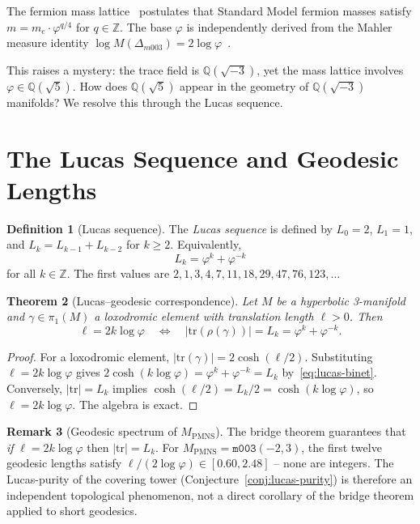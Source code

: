 \documentclass[12pt]{article}
\newtheorem{theorem}{Theorem}
\theoremstyle{definition}
\newtheorem{definition}[theorem]{Definition}
\newtheorem{remark}[theorem]{Remark}
\newcommand{\Z}{\mathbb{Z}}
\newcommand{\Q}{\mathbb{Q}}
\newcommand{\ph}{\varphi}
\newcommand{\logph}{\log\ph}
\begin{document}
The fermion mass lattice~\cite{gentry-core} postulates that Standard
Model fermion masses satisfy $m = m_e \cdot \ph^{q/4}$ for $q \in \Z$.
The base $\ph$ is independently derived from the Mahler measure identity
$\log M(\Delta_{m003}) = 2\logph$~\cite{gentry-jktr}.

This raises a mystery: the trace field is $\Q(\sqrt{-3})$, yet the
mass lattice involves $\ph \in \Q(\sqrt{5})$. How does $\Q(\sqrt{5})$
appear in the geometry of $\Q(\sqrt{-3})$ manifolds?
We resolve this through the Lucas sequence.

\section{The Lucas Sequence and Geodesic Lengths}

\begin{definition}[Lucas sequence]
The \emph{Lucas sequence} is defined by $L_0 = 2$, $L_1 = 1$, and
$L_k = L_{k-1} + L_{k-2}$ for $k \geq 2$. Equivalently,
\begin{equation}
  L_k = \ph^k + \ph^{-k}
  \label{eq:lucas-binet}
\end{equation}
for all $k \in \Z$. The first values are
$2, 1, 3, 4, 7, 11, 18, 29, 47, 76, 123, \ldots$
\end{definition}

\begin{theorem}[Lucas--geodesic correspondence]
\label{thm:lucas-geodesic}
Let $M$ be a hyperbolic 3-manifold and $\gamma \in \pi_1(M)$ a
loxodromic element with translation length $\ell > 0$. Then
\begin{equation}
  \ell = 2k\logph
  \quad \Longleftrightarrow \quad
  |\mathrm{tr}(\rho(\gamma))| = L_k = \ph^k + \ph^{-k}.
  \label{eq:bridge}
\end{equation}
\end{theorem}

\begin{proof}
For a loxodromic element, $|\mathrm{tr}(\gamma)| = 2\cosh(\ell/2)$.
Substituting $\ell = 2k\logph$ gives
$2\cosh(k\logph) = \ph^k + \ph^{-k} = L_k$
by~\eqref{eq:lucas-binet}.
Conversely, $|\mathrm{tr}| = L_k$ implies
$\cosh(\ell/2) = L_k/2 = \cosh(k\logph)$,
so $\ell = 2k\logph$. The algebra is exact.
\end{proof}

\begin{remark}[Geodesic spectrum of $M_{\mathrm{PMNS}}$]
\label{rem:spectrum}
The bridge theorem guarantees that \emph{if} $\ell = 2k\logph$ then
$|\mathrm{tr}| = L_k$. For $M_{\mathrm{PMNS}} = \texttt{m003}(-2,3)$,
the first twelve geodesic lengths satisfy
$\ell/(2\logph) \in [0.60, 2.48]$ -- none are integers.
The Lucas-purity of the covering tower (Conjecture~\ref{conj:lucas-purity})
is therefore an independent topological phenomenon, not a direct
corollary of the bridge theorem applied to short geodesics.
\end{remark}
\end{document}
